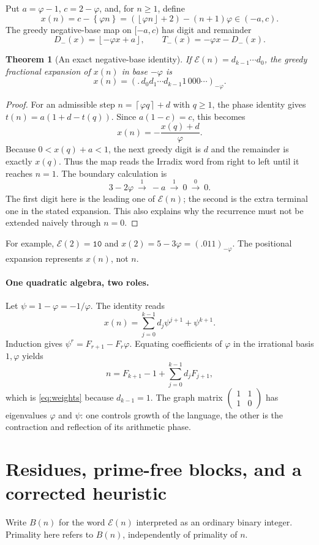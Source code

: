 \documentclass[11pt]{article}
\newtheorem{theorem}{Theorem}[section]
\theoremstyle{definition}\newtheorem{definition}[theorem]{Definition}
\newcommand{\ph}{\varphi}
\newcommand{\fl}[1]{\left\lfloor #1\right\rfloor}
\newcommand{\cl}[1]{\left\lceil #1\right\rceil}
\newcommand{\fr}[1]{\left\{#1\right\}}
\newcommand{\E}{\mathcal E}
\begin{document}
Put $a=\ph-1$, $c=2-\ph$, and, for $n\ge1$, define
\[
x(n)=c-\fr{\ph n}=(\fl{\ph n}+2)-(n+1)\ph\in(-a,c).
\]
The greedy negative-base map on $[-a,c)$ has digit and remainder
\[
D_-(x)=\fl{-\ph x+a},\qquad T_-(x)=-\ph x-D_-(x).
\]
\begin{theorem}[An exact negative-base identity]
If $\E(n)=d_{k-1}\cdots d_0$, the greedy fractional expansion of $x(n)$
in base $-\ph$ is
\[
\boxed{\quad x(n)=(.\,d_0d_1\cdots d_{k-1}1\,000\cdots)_{-\ph}.\quad}
\]
\end{theorem}
\begin{proof}
For an admissible step $n=\cl{\ph q}+d$ with $q\ge1$, the phase identity
gives $t(n)=a(1+d-t(q))$. Since $a(1-c)=c$, this becomes
\[
x(n)=-\frac{x(q)+d}{\ph}.
\]
Because $0<x(q)+a<1$, the next greedy digit is $d$ and the remainder
is exactly $x(q)$. Thus the map reads the Irradix word from right to
left until it reaches $n=1$. The boundary calculation is
\[
3-2\ph\ \xrightarrow{\ 1\ }\ -a\
\xrightarrow{\ 1\ }\ 0\ \xrightarrow{\ 0\ }\ 0.
\]
The first digit here is the leading one of $\E(n)$; the second is the
extra terminal one in the stated expansion. This also explains why the
recurrence must not be extended naively through $n=0$.
\end{proof}
For example, $\E(2)=\texttt{10}$ and $x(2)=5-3\ph=(.011)_{-\ph}$.
The positional expansion represents $x(n)$, not $n$.

\paragraph{One quadratic algebra, two roles.}
Let $\psi=1-\ph=-1/\ph$. The identity reads
\[
x(n)=\sum_{j=0}^{k-1}d_j\psi^{j+1}+\psi^{k+1}.
\]
Induction gives $\psi^r=F_{r+1}-F_r\ph$. Equating coefficients of $\ph$
in the irrational basis $1,\ph$ yields
\[
n=F_{k+1}-1+\sum_{j=0}^{k-1}d_jF_{j+1},
\]
which is \eqref{eq:weights} because $d_{k-1}=1$.
The graph matrix $\left(\begin{smallmatrix}1&1\\1&0\end{smallmatrix}\right)$
has eigenvalues $\ph$ and $\psi$: one controls growth of the language,
the other is the contraction and reflection of its arithmetic phase.

\section{Residues, prime-free blocks, and a corrected heuristic}
Write $B(n)$ for the word $\E(n)$ interpreted as an ordinary binary
integer. Primality here refers to $B(n)$, independently of primality of $n$.
\end{document}
